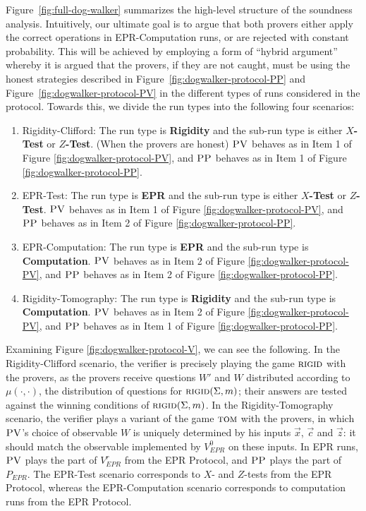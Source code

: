 Figure~\ref{fig:full-dog-walker} summarizes the high-level structure of the soundness analysis. Intuitively, our ultimate goal is to argue that both provers either apply the correct operations in EPR-Computation runs, or are rejected with constant probability. This will be achieved by employing a form of ``hybrid argument'' whereby it is argued that the provers, if they are not caught, must be using the honest strategies described in Figure~\ref{fig:dogwalker-protocol-PP} and Figure~\ref{fig:dogwalker-protocol-PV} in the different types of runs considered in the protocol. Towards this, we divide the run types into the following four scenarios:
\begin{enumerate}
\item Rigidity-Clifford: The run type is \textbf{Rigidity} and the sub-run type is either \textbf{$X$-Test} or \textbf{$Z$-Test}. (When the provers are honest) $\textsc{PV}$ behaves as in Item 1 of Figure \ref{fig:dogwalker-protocol-PV}, and $\textsc{PP}$ behaves as in Item 1 of Figure \ref{fig:dogwalker-protocol-PP}. 
\item EPR-Test: The run type is \textbf{EPR} and the sub-run type is either \textbf{$X$-Test} or \textbf{$Z$-Test}. $\textsc{PV}$ behaves as  in Item 1 of Figure \ref{fig:dogwalker-protocol-PV}, and $\textsc{PP}$ behaves as in Item 2 of Figure \ref{fig:dogwalker-protocol-PP}. 
\item EPR-Computation: The run type is \textbf{EPR} and the sub-run type is \textbf{Computation}. $\textsc{PV}$ behaves as in Item 2 of Figure \ref{fig:dogwalker-protocol-PV}, and $\textsc{PP}$ behaves as in Item 2 of Figure \ref{fig:dogwalker-protocol-PP}. 
\item Rigidity-Tomography: The run type is \textbf{Rigidity} and the sub-run type is \textbf{Computation}. $\textsc{PV}$ behaves as in Item 2 of Figure \ref{fig:dogwalker-protocol-PV}, and $\textsc{PP}$ behaves as in Item 1 of Figure \ref{fig:dogwalker-protocol-PP}. 
\end{enumerate}
Examining Figure \ref{fig:dogwalker-protocol-V}, we can see the following. In the Rigidity-Clifford scenario, the verifier is precisely playing the game $\textsc{rigid}$ with the provers, as the provers receive questions $W'$ and $W$ distributed according to $\mu(\cdot,\cdot)$, the distribution of questions for $\textsc{rigid}(\Sigma,m)$; their answers are tested against the winning conditions of $\textsc{rigid}(\Sigma,m)$. In the Rigidity-Tomography scenario, the verifier plays a variant of the game $\textsc{tom}$ with the provers, in which $\textsc{PV}$'s choice of observable $W$ is uniquely determined by his inputs $\vec{x}$, $\vec{c}$ and $\vec{z}$: it should match the observable implemented by $V_{EPR}^0$ on these inputs. In EPR runs, $\textsc{PV}$ plays the part of $V_{EPR}^r$ from the EPR Protocol, and $\textsc{PP}$ plays the part of $P_{EPR}$. The EPR-Test scenario corresponds to $X$- and $Z$-tests from the EPR Protocol, whereas the EPR-Computation scenario corresponds to computation runs from the EPR Protocol.

